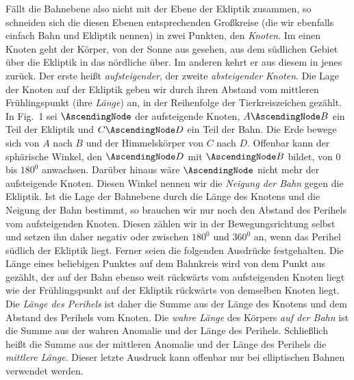 Fällt die Bahnebene also nicht mit der Ebene der Ekliptik zusammen, so schneiden sich die diesen Ebenen entsprechenden Großkreise (die wir ebenfalls einfach Bahn und Ekliptik nennen) in zwei Punkten, den \emph{Knoten}. Im einen Knoten geht der Körper, von der Sonne aus gesehen, aus dem südlichen Gebiet über die Ekliptik in das nördliche über. Im anderen kehrt er aus diesem in jenes zurück. Der erste heißt \emph{aufsteigender}, der zweite \emph{absteigender Knoten}. Die Lage der Knoten auf der Ekliptik geben wir durch ihren Abstand vom mittleren
Frühlingspunkt (ihre \emph{Länge}) an, in der Reihenfolge der Tierkreiszeichen gezählt. In Fig.~1 sei $\AscendingNode$ der aufsteigende Knoten, $A\AscendingNode B$ ein Teil der Ekliptik und $C\AscendingNode D$ ein Teil der Bahn. Die Erde bewege sich von $A$ nach $B$ und der Himmelskörper von $C$ nach $D$. Offenbar kann der sphärische Winkel, den $\AscendingNode D$ mit $\AscendingNode B$ bildet, von $0$ bis $180^0$ anwachsen. Darüber hinaus wäre $\AscendingNode$ nicht mehr der aufsteigende Knoten. Diesen Winkel nennen wir die \emph{Neigung der Bahn} gegen die Ekliptik. Ist die Lage der Bahnebene durch die Länge des Knotens und die Neigung der Bahn bestimmt, so brauchen wir nur noch den Abstand des Perihels vom aufsteigenden Knoten. Diesen zählen wir in der Bewegungsrichtung selbst und setzen ihn daher negativ oder zwischen $180^0$ und $360^0$ an, wenn das Perihel südlich der Ekliptik liegt. Ferner seien die folgenden Ausdrücke festgehalten. Die Länge eines beliebigen Punktes auf dem Bahnkreis wird von dem Punkt aus gezählt, der auf der Bahn ebenso weit rückwärts vom aufsteigenden Knoten liegt wie der Frühlingspunkt auf der Ekliptik rückwärts von demselben Knoten liegt. Die \emph{Länge des Perihels} ist daher die Summe aus der Länge des Knotens und dem Abstand des Perihels vom Knoten. Die \emph{wahre Länge} des Körpers \emph{auf der Bahn} ist die Summe aus der wahren Anomalie und der Länge des Perihels. Schließlich heißt die Summe aus der mittleren Anomalie und der Länge des Perihels die \emph{mittlere Länge}. Dieser letzte Ausdruck kann offenbar nur bei elliptischen Bahnen verwendet werden.

